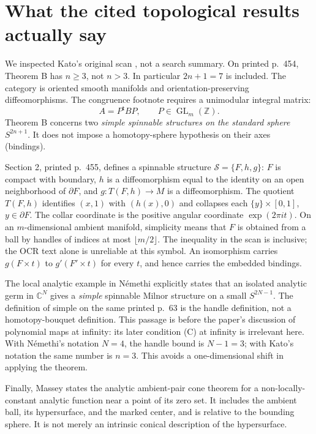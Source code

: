 \documentclass[11pt]{article}
\newcommand{\C}{\mathbb C}
\newcommand{\Z}{\mathbb Z}
\begin{document}
\section{What the cited topological results actually say}

We inspected Kato's original scan \cite{Kato}, not a search summary.
On printed p.~454, Theorem B has \(n\geq3\), not \(n>3\).
In particular \(2n+1=7\) is included. The category is oriented smooth
manifolds and orientation-preserving diffeomorphisms.
The congruence footnote requires a unimodular integral matrix:
\[
A=P^{\mathsf t}BP,\qquad P\in\operatorname{GL}_m(\Z).               \tag{3}
\]
Theorem B concerns two \emph{simple spinnable structures on the standard
sphere} \(S^{2n+1}\). It does not impose a homotopy-sphere hypothesis
on their axes (bindings).

Section 2, printed p.~455, defines a spinnable structure
\(\mathcal S=\{F,h,g\}\): \(F\) is compact with boundary,
\(h\) is a diffeomorphism equal to the identity on an open neighborhood
of \(\partial F\), and \(g:T(F,h)\to M\) is a diffeomorphism.
The quotient \(T(F,h)\) identifies \((x,1)\) with \((h(x),0)\)
and collapses each \(\{y\}\times[0,1]\), \(y\in\partial F\).
The collar coordinate is the positive angular coordinate
\(\exp(2\pi i t)\). On an \(m\)-dimensional ambient manifold, simplicity
means that \(F\) is obtained from a ball by handles of indices at most
\(\lfloor m/2\rfloor\). The inequality in the scan is inclusive;
the OCR text alone is unreliable at this symbol.
An isomorphism carries \(g(F\times t)\) to \(g'(F'\times t)\) for
every \(t\), and hence carries the embedded bindings.

The local analytic example in N\'emethi \cite[pp.~63--64]{Nemethi}
explicitly states that an isolated analytic germ in \(\C^N\) gives
a \emph{simple} spinnable Milnor structure on a small \(S^{2N-1}\).
The definition of simple on the same printed p.~63 is the handle
definition, not a homotopy-bouquet definition. This passage is before
the paper's discussion of polynomial maps at infinity: its later
condition (C) at infinity is irrelevant here. With N\'emethi's
notation \(N=4\), the handle bound is \(N-1=3\); with Kato's notation
the same number is \(n=3\). This avoids a one-dimensional shift in
applying the theorem.

Finally, Massey \cite[Theorem 1.4, p.~4]{Massey} states the analytic
ambient-pair cone theorem for a non-locally-constant analytic function
near a point of its zero set. It includes the ambient ball, its
hypersurface, and the marked center, and is relative to the bounding
sphere. It is not merely an intrinsic conical description of the
hypersurface.
\end{document}
